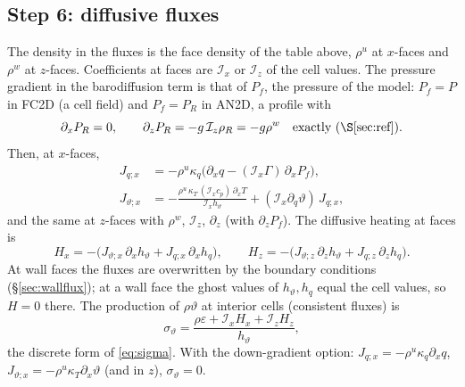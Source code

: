 \documentclass[11pt,a4paper]{article}
\newcommand{\vt}{\vartheta}                    %
\newcommand{\hth}{{h_{\vartheta}}}               %
\newcommand{\hq}{{h_q}}                          %
\newcommand{\Ix}{\mathcal{I}_x}
\newcommand{\Iz}{\mathcal{I}_z}
\begin{document}
\subsection{Step 6: diffusive fluxes}
The density in the fluxes is the face density of the table above, $\rho^u$ at $x$-faces and $\rho^w$ at $z$-faces. Coefficients at faces are $\Ix$ or $\Iz$ of the cell values. The pressure gradient in the barodiffusion term is that of $P_f$, the pressure of the model: $P_f=P$ in FC2D (a cell field) and $P_f=P_R$ in AN2D, a profile with
\begin{equation}
  \partial_xP_R=0,\qquad \partial_zP_R=-g\,\Iz\rho_R=-g\rho^w\quad\text{exactly (\S\ref{sec:ref})}.
\end{equation}
Then, at $x$-faces,
\begin{align}
  J_{q;x}&=-\rho^u\kappa_q\big(\partial_xq-(\Ix\Gamma)\,\partial_xP_f\big),\\
  J_{\vt;x}&=-\frac{\rho^u\,\kappa_T\,(\Ix c_p)\,\partial_xT}{\Ix\hth}+(\Ix\partial_q\vt)\,J_{q;x},
\end{align}
and the same at $z$-faces with $\rho^w$, $\Iz$, $\partial_z$ (with $\partial_zP_f$). The diffusive heating at faces is
\begin{equation}
  H_x=-\big(J_{\vt;x}\,\partial_x\hth+J_{q;x}\,\partial_x\hq\big),\qquad H_z=-\big(J_{\vt;z}\,\partial_z\hth+J_{q;z}\,\partial_z\hq\big).
\end{equation}
At wall faces the fluxes are overwritten by the boundary conditions (\S\ref{sec:wallflux}); at a wall face the ghost values of $\hth,\hq$ equal the cell values, so $H=0$ there. The production of $\rho\vt$ at interior cells (consistent fluxes) is
\begin{equation}
  \sigma_\vt=\frac{\rho\varepsilon+\Ix H_x+\Iz H_z}{\hth},
  \label{eq:sigmad}
\end{equation}
the discrete form of \eqref{eq:sigma}. With the down-gradient option: $J_{q;x}=-\rho^u\kappa_q\partial_xq$, $J_{\vt;x}=-\rho^u\kappa_T\partial_x\vt$ (and in $z$), $\sigma_\vt=0$.
\end{document}
